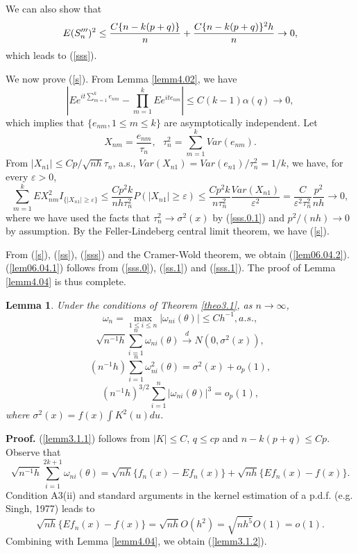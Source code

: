 \documentclass[12pt]{article}
\newtheorem{lemm}{\sc Lemma}
\newcommand{\tod}{\stackrel{d}{\longrightarrow}}
\def\be{\begin{equation}}
\def\ee{\end{equation}}
\begin{document}
We can also show that
\be
 E(S'''_n)^2\leq  {C\{n-k(p+q)\}\over n} + {C\{n-k(p+q)\}^2h\over n}
 \rightarrow 0, \label{sss.1}
\ee
which leads to  (\ref{sss}).

We now prove (\ref{s}). From Lemma \ref{lemm4.02}, we have
\be
\left| Ee^{it\sum^k_{m=1}e_{nm}}-\prod^k_{m=1}Ee^{ite_{nm}}\right|\leq C(k-1)\alpha (q) \to 0, \label{s.1}
\ee
which implies that $\{e_{nm}, 1\leq m\leq k\}$ are asymptotically independent.
Let
\[
X_{nm}=\frac{e_{nm}}{\tau_n},~~~\tau_n^2=\sum_{m=1}^{k}Var(e_{nm}).
\]
From $|X_{n1}|\leq Cp/\sqrt{nh}\tau_n$, a.s.,  $Var(X_{n1})=Var(e_{n1})/\tau_n^2=1/k$, we have,
for every $\varepsilon>0$,
\[
\sum_{m=1}^{k}EX_{nm}^2I_{\{|X_{n1}|\geq\varepsilon\}}
\leq\frac{Cp^2k}{nh\tau^2_n}P(|X_{n1}|\geq\varepsilon)
\leq\frac{Cp^2k}{n\tau^2_n}\frac{Var(X_{n1})}{\varepsilon^2}
=\frac{C}{\varepsilon^2\tau^2_n}\frac{p^2}{nh}\rightarrow 0,
\]
where we have used the facts that $\tau^2_n \to \sigma^2(x)$ by (\ref{sss.0.1}) and $p^2/(nh) \to 0$ by assumption.
By the Feller-Lindeberg central limit theorem, we have (\ref{s}).

From (\ref{s}), (\ref{ss}), (\ref{sss}) and the Cramer-Wold theorem, we obtain (\ref{lem06.04.2}).
(\ref{lem06.04.1}) follows from  (\ref{sss.0}),  (\ref{ss.1}) and  (\ref{sss.1}). The proof of Lemma \ref{lemm4.04} is thus complete.

\smallskip

\begin{lemm}\label{lemm3.1}
Under the conditions of Theorem \ref{theo3.1}, as $n\to \infty$, \be
\omega_{n}=\max_{1\leq i\leq n}|\omega_{ni}(\theta)|\leq C
h^{-1}, a. s.,   \label{lemm3.1.1} \ee \be
\sqrt{n^{-1}h}\sum^{n}_{i=1}\omega_{ni}(\theta)\tod N(0,
\sigma^2(x)),  \label{lemm3.1.2} \ee \be
(n^{-1}h)\sum^{n}_{i=1}\omega^2_{ni}(\theta)=\sigma^2(x)+o_p(1),
\label{lemm3.1.3} \ee
 \be
(n^{-1}h)^{3/2}\sum^{n}_{i=1}|\omega_{ni}(\theta)|^3=o_p(1),  \label{lemm3.1.4}
\ee
where $\sigma^2(x)=f(x)\int K^2(u)du$.
\end{lemm}

{\bf Proof. } (\ref{lemm3.1.1}) follows from $|K|\leq C$, $q\leq cp$ and $n-k(p+q)\leq Cp$. Observe that
\[
\sqrt{n^{-1}h}\sum^{2k+1}_{i=1}\omega_{ni}(\theta)
=\sqrt{nh}\{f_n(x)-Ef_n(x)\}+\sqrt{nh}\{Ef_n(x)-f(x)\}.  \label{lemm3.1.2.1}
\]
Condition A3(ii) and standard arguments in the kernel estimation of a p.d.f.  (e.g. Singh, 1977) leads to
\[
\sqrt{nh}\{Ef_n(x)-f(x)\}=\sqrt{nh}O(h^2)=\sqrt{nh^{5}}O(1)=o(1). \label{lemm3.1.2.2}
\]
Combining with Lemma \ref{lemm4.04}, we obtain (\ref{lemm3.1.2}).
\end{document}

